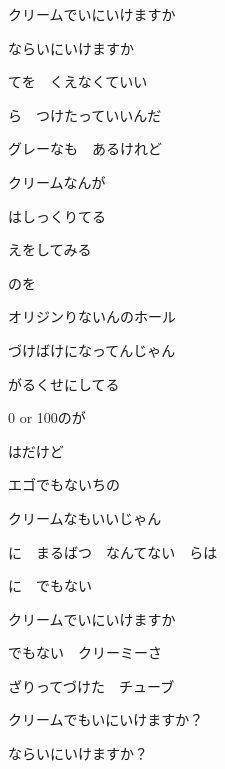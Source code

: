\documentclass[a4paper,tate,twocolumn,12pt]{ltjtarticle}
\begin{document}
\begin{flushleft}
\begin{minipage}{\linewidth}
クリームでいにいけますか

ならいにいけますか
\end{minipage}

\vspace{2em}

\noindent\begin{minipage}{\linewidth}
てを　くえなくていい

ら　つけたっていいんだ

グレーなも　あるけれど

クリームなんが

はしっくりてる

えをしてみる
\end{minipage}

\vspace{2em}

\noindent\begin{minipage}{\linewidth}
のを

オリジンりないんのホール

づけばけになってんじゃん

がるくせにしてる

0 or 100のが

はだけど

エゴでもないちの

クリームなもいいじゃん
\end{minipage}

\vspace{2em}

\noindent\begin{minipage}{\linewidth}
に　まるばつ　なんてない　らは

に　でもない

クリームでいにいけますか

でもない　クリーミーさ

ざりってづけた　チューブ

クリームでもいにいけますか？

ならいにいけますか？
\end{minipage}

\end{flushleft}
\end{document}
